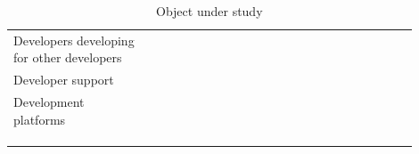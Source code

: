 \documentclass[english, 12pt, a4paper, sci, utf8, a-1b, online]{aaltothesis}
\begin{document}
\begin{center}
\begin{longtable}{p{0.3\linewidth}p{0.6\linewidth}}
    Developers developing for other developers & \textcite{the-best-practices-for-a-great-dx} \newline \textcite{heroku-dx} \newline  \textcite{developer-experience-what-and-why} \newline \textcite{dx-devs-are-people-too} \newline \textcite{developer-experience-sanity} \newline \textcite{building-the-developer-experience-from-the-ground-up} \\
    Developer support                          & \textcite{api-developer-experience-dx-resources} \newline \textcite{contributing-as-a-designer}                                                                                                                                                                                                       \\
    Development platforms                      & \textcite{effective-developer-experience} \newline \textcite{workflows-for-the-new-developer-experience}                                                                                                                                                                                              \\
    \captionsetup{width=0.6\textwidth}                                                                                                                                                                                                                                                                                                                 \\
    \caption{Object under study}                                                                                                                                                                                                                                                                                                                       \\
    \label{table:object-under-study}                                                                                                                                                                                                                                                                                                                   \\
  \end{longtable}
\end{center}
\renewcommand{\arraystretch}{1}
\end{document}
